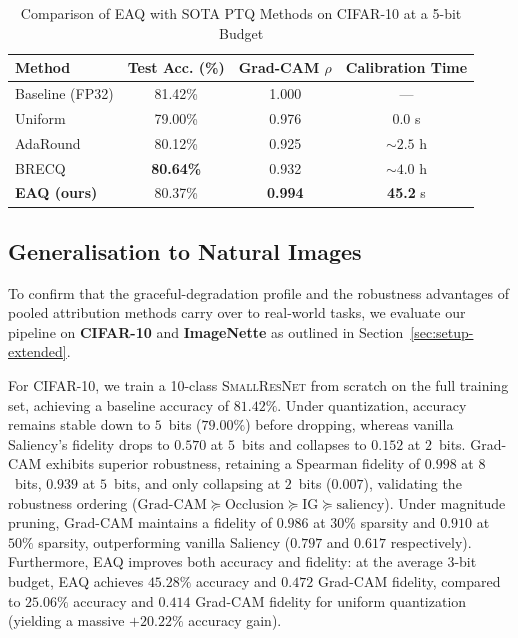 \begin{table}[!h]
\caption{Comparison of EAQ with SOTA PTQ Methods on CIFAR-10 at a 5-bit Budget}
\label{tab:sotacomp}
\centering
\begin{tabular}{lccc}
\hline
\textbf{Method} & \textbf{Test Acc. (\%)} & \textbf{Grad-CAM $\rho$} & \textbf{Calibration Time} \\
\hline
Baseline (FP32) & 81.42\% & 1.000 & --- \\
Uniform & 79.00\% & 0.976 & $0.0$ s \\
AdaRound \cite{nagel2020adaround} & 80.12\% & 0.925 & $\sim 2.5$ h \\
BRECQ \cite{li2021brecq} & \textbf{80.64\%} & 0.932 & $\sim 4.0$ h \\
\textbf{EAQ (ours)} & 80.37\% & \textbf{0.994} & \textbf{45.2} s \\
\hline
\end{tabular}
\end{table}

\subsection{Generalisation to Natural Images}
\label{sec:results-natural}
To confirm that the graceful-degradation profile and the robustness advantages of pooled attribution methods carry over to real-world tasks, we evaluate our pipeline on \textbf{CIFAR-10} and \textbf{ImageNette} as outlined in Section~\ref{sec:setup-extended}. 

For CIFAR-10, we train a 10-class \textsc{SmallResNet} from scratch on the full training set, achieving a baseline accuracy of $81.42\%$. Under quantization, accuracy remains stable down to $5$~bits ($79.00\%$) before dropping, whereas vanilla Saliency's fidelity drops to $0.570$ at $5$~bits and collapses to $0.152$ at $2$~bits. Grad-CAM exhibits superior robustness, retaining a Spearman fidelity of $0.998$ at $8$~bits, $0.939$ at $5$~bits, and only collapsing at $2$~bits ($0.007$), validating the robustness ordering ($\text{Grad-CAM}\succeq\text{Occlusion}\succeq\text{IG}\succeq\text{saliency}$). Under magnitude pruning, Grad-CAM maintains a fidelity of $0.986$ at $30\%$ sparsity and $0.910$ at $50\%$ sparsity, outperforming vanilla Saliency ($0.797$ and $0.617$ respectively). Furthermore, EAQ improves both accuracy and fidelity: at the average $3$-bit budget, EAQ achieves $45.28\%$ accuracy and $0.472$ Grad-CAM fidelity, compared to $25.06\%$ accuracy and $0.414$ Grad-CAM fidelity for uniform quantization (yielding a massive $+20.22\%$ accuracy gain).

